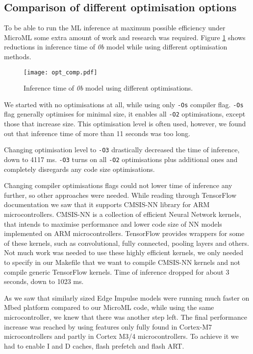\subsection{ Comparison of different optimisation options}

To be able to run the ML inference at maximum possible efficiency under MicroML some extra amount of work and research was required.
Figure \ref{opt_comp} shows reductions in inference time of \textit{0b} model while using different optimisation methods.
\newline

\begin{figure}[ht]
    \centering
    \texttt{[image: opt\_comp.pdf]}
    \caption{ Inference time of \textit{0b} model using different optimisations.}
    \label{opt_comp}
\end{figure}

We started with no optimisations at all, while using only \verb|-Os| compiler flag.
\verb|-Os| flag generally optimises for minimal size, it enables all \verb|-O2| optimisations, except those that increase size.
This optimisation level is often used, however, we found out that inference time of more than 11 seconds was too long.

Changing optimisation level to \verb|-O3| drastically decreased the time of inference, down to 4117 \si{\milli\second}.
\verb|-O3| turns on all \verb|-O2| optimisations plus additional ones and completely disregards any code size optimisations.

Changing compiler optimisations flags could not lower time of inference any further, so other approaches were needed.
While reading through TensorFlow documentation we saw that it supports CMSIS-NN library for ARM microcontrollers.
CMSIS-NN is a collection of efficient Neural Network kernels, that intends to maximise performance and lower code size of NN models implemented on ARM microcontrollers.
TensorFlow provides wrappers for some of these kernels, such as convolutional, fully connected, pooling layers and others.
Not much work was needed to use these highly efficient kernels, we only needed to specify in our Makefile that we want to compile CMSIS-NN kernels and not compile generic TensorFlow kernels. 
Time of inference dropped for about 3 seconds, down to 1023 \si{\milli\second}.

As we saw that similarly sized Edge Impulse models were running much faster on Mbed platform compared to our MicroML code, while using the same microcontroller, we knew that there was another step left.
The final performance increase was reached by using features only fully found in Cortex-M7 microcontrollers and partly in Cortex M3/4 microcontrollers. 
To achieve it we had to enable I and D caches, flash prefetch and flash ART.

